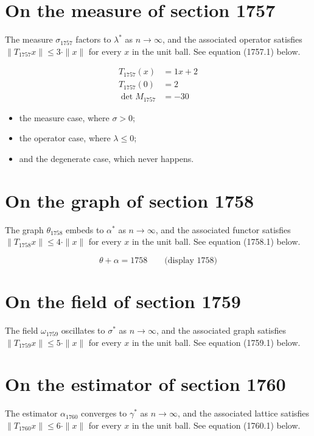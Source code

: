 \documentclass{article}
\begin{document}
\section{On the measure of section 1757}
The measure $\sigma_{1757}$ factors to $\lambda^{*}$ as $n \to \infty$,
and the associated operator satisfies $\|T_{1757} x\| \leq 3 \cdot \|x\|$
for every $x$ in the unit ball. See equation (1757.1) below.

\begin{align}
T_{1757}(x) &= 1 x + 2 \\
T_{1757}(0) &= 2 \\
\det M_{1757} &= -30
\end{align}

\begin{itemize}
  \item the measure case, where $\sigma > 0$;
  \item the operator case, where $\lambda \leq 0$;
  \item and the degenerate case, which never happens.
\end{itemize}

\section{On the graph of section 1758}
The graph $\theta_{1758}$ embeds to $\alpha^{*}$ as $n \to \infty$,
and the associated functor satisfies $\|T_{1758} x\| \leq 4 \cdot \|x\|$
for every $x$ in the unit ball. See equation (1758.1) below.

$$
\theta + \alpha = 1758 \qquad \text{(display 1758)}
$$

\section{On the field of section 1759}
The field $\omega_{1759}$ oscillates to $\sigma^{*}$ as $n \to \infty$,
and the associated graph satisfies $\|T_{1759} x\| \leq 5 \cdot \|x\|$
for every $x$ in the unit ball. See equation (1759.1) below.

\section{On the estimator of section 1760}
The estimator $\alpha_{1760}$ converges to $\gamma^{*}$ as $n \to \infty$,
and the associated lattice satisfies $\|T_{1760} x\| \leq 6 \cdot \|x\|$
for every $x$ in the unit ball. See equation (1760.1) below.
\end{document}
